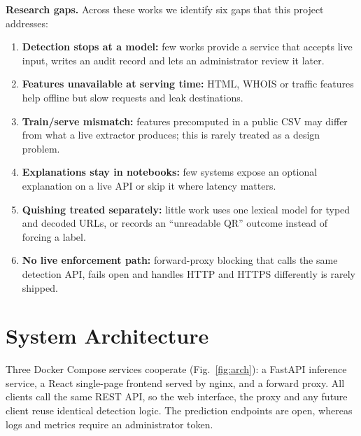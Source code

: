 \documentclass[conference]{IEEEtran}
\begin{document}
\textbf{Research gaps.} Across these works we identify six gaps that this project addresses:
\begin{enumerate}
\item \textbf{Detection stops at a model:} few works provide a service that accepts live input, writes an audit record and lets an administrator review it later.
\item \textbf{Features unavailable at serving time:} HTML, WHOIS or traffic features help offline but slow requests and leak destinations.
\item \textbf{Train/serve mismatch:} features precomputed in a public CSV may differ from what a live extractor produces; this is rarely treated as a design problem.
\item \textbf{Explanations stay in notebooks:} few systems expose an optional explanation on a live API or skip it where latency matters.
\item \textbf{Quishing treated separately:} little work uses one lexical model for typed and decoded URLs, or records an ``unreadable QR'' outcome instead of forcing a label.
\item \textbf{No live enforcement path:} forward-proxy blocking that calls the same detection API, fails open and handles HTTP and HTTPS differently is rarely shipped.
\end{enumerate}

\section{System Architecture}
Three Docker Compose services cooperate (Fig.~\ref{fig:arch}): a FastAPI inference service, a React single-page frontend served by nginx, and a forward proxy. All clients call the same REST API, so the web interface, the proxy and any future client reuse identical detection logic. The prediction endpoints are open, whereas logs and metrics require an administrator token.
\end{document}
